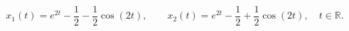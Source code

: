 \[x_1(t)=e^{2t}-\frac12-\frac12\cos(2t),\qquad
x_2(t)=e^{2t}-\frac12+\frac12\cos(2t),\quad t\in\mathbb R.\]
